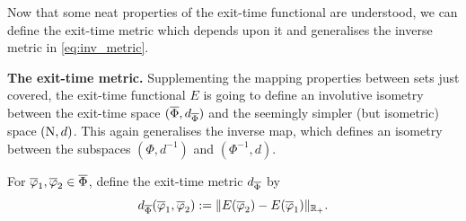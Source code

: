 Now that some neat properties of the exit-time functional are understood, we can define the exit-time metric which depends upon it and generalises the inverse metric in \autoref{eq:inv_metric}.

\vspace{3mm}\textbf{The exit-time metric.} Supplementing the mapping properties between sets just covered, the exit-time functional $E$ is going to define an involutive isometry between the exit-time space $(\overline{\Phi},d_{\overline{\Phi}})$ and the seemingly simpler (but isometric) space $(\mathrm{N},d)$. This again generalises the inverse map, which defines an isometry between the subspaces $(\Phi,d^{-1})$ and $(\Phi^{-1},d)$.

\begin{definition}\label{def:exit_metric}
    For $\overline{\varphi}_1,\overline{\varphi}_2\in\overline{\Phi}$, define the exit-time metric $d_{\overline{\Phi}}$ by
    \begin{equation}\label{eq:exit_metric}
        d_{\overline{\Phi}}(\overline{\varphi}_1,\overline{\varphi}_2) := \Vert E(\overline{\varphi}_2) - E(\overline{\varphi}_1) \Vert_{\mathbb{R}_+}.
    \end{equation}
\end{definition}

